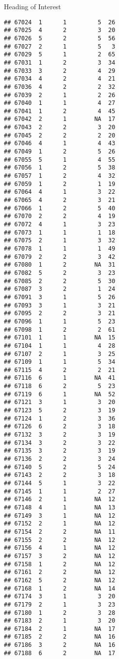 \documentclass[
  ignorenonframetext,
]{beamer}
\begin{document}
\begin{frame}[fragile]{Heading of Interest}
\begin{verbatim}
## 67024  1      1         5  26
## 67025  4      2         3  20
## 67026  5      2         5  56
## 67027  2      1         5   3
## 67029  5      1         2  65
## 67031  1      2         3  34
## 67033  3      2         4  29
## 67034  4      2         4  21
## 67036  4      2         2  32
## 67039  2      1         2  26
## 67040  1      1         4  27
## 67041  1      2         4  45
## 67042  2      1        NA  17
## 67043  2      2         3  20
## 67045  2      2         2  20
## 67046  4      1         4  43
## 67049  1      2         5  26
## 67055  5      1         4  55
## 67056  1      2         5  38
## 67057  1      2         4  32
## 67059  1      2         1  19
## 67064  4      1         3  22
## 67065  4      2         3  21
## 67066  1      2         5  40
## 67070  2      2         4  19
## 67072  4      1         3  23
## 67073  1      1         1  18
## 67075  2      1         3  32
## 67078  1      1         1  49
## 67079  2      2         3  42
## 67080  1      2        NA  31
## 67082  5      2         3  23
## 67085  2      2         5  30
## 67087  3      2         1  24
## 67091  3      1         5  26
## 67093  3      1         3  21
## 67095  2      2         3  21
## 67096  1      1         5  23
## 67098  1      2         2  61
## 67101  1      1        NA  15
## 67104  1      1         4  28
## 67107  2      1         3  25
## 67109  1      1         5  34
## 67115  4      2         2  21
## 67116  6      1        NA  41
## 67118  6      2         5  23
## 67119  6      1        NA  52
## 67121  3      1         3  20
## 67123  5      2         3  19
## 67124  1      2         3  36
## 67126  6      2         3  18
## 67132  3      2         3  19
## 67134  3      2         3  22
## 67135  3      2         3  19
## 67136  2      2         3  24
## 67140  5      2         5  24
## 67143  2      2         3  18
## 67144  5      1         3  22
## 67145  1      1         2  27
## 67146  2      1        NA  12
## 67148  4      1        NA  13
## 67149  3      1        NA  12
## 67152  2      1        NA  12
## 67154  2      2        NA  11
## 67155  2      2        NA  12
## 67156  4      1        NA  12
## 67157  3      2        NA  12
## 67158  1      2        NA  12
## 67161  2      2        NA  12
## 67162  5      2        NA  12
## 67168  1      2        NA  14
## 67174  3      1         3  20
## 67179  2      1         3  23
## 67180  1      2         3  28
## 67183  2      1         3  20
## 67184  2      1        NA  17
## 67185  2      2        NA  16
## 67186  3      2        NA  16
## 67188  6      2        NA  17

\end{verbatim}
\end{frame}
\end{document}
